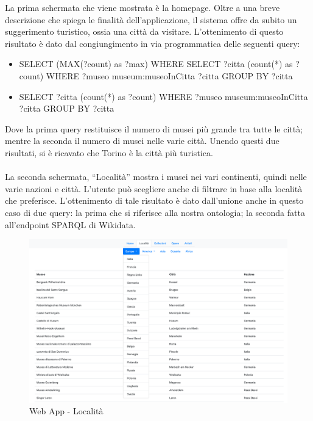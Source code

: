 \documentclass[12pt]{article}
\begin{document}
La prima schermata che viene mostrata è la homepage. Oltre a una breve descrizione che spiega le finalità dell’applicazione, il sistema offre da subito un suggerimento turistico, ossia una città da visitare.
L’ottenimento di questo risultato è dato dal congiungimento in via programmatica delle seguenti query:

\begin{itemize}
 \item SELECT (MAX(?count) as ?max) WHERE{ SELECT ?citta (count(*) as ?count) WHERE { ?museo museum:museoInCitta ?citta} GROUP BY ?citta}
 \item SELECT ?citta (count(*) as ?count) WHERE { ?museo museum:museoInCitta ?citta} GROUP BY ?citta
\end{itemize} 

Dove la prima query restituisce il numero di musei più grande tra tutte le città; mentre la seconda il numero di musei nelle varie città. Unendo questi due risultati, si è ricavato che Torino è la città più turistica. 
\\
\\
La seconda schermata, “Località” mostra i musei nei vari continenti, quindi nelle varie nazioni e città. L’utente può scegliere anche di filtrare in base alla località che preferisce. L’ottenimento di tale risultato è dato dall’unione anche in questo caso di due query: la prima che si riferisce alla nostra ontologia; la seconda fatta all’endpoint SPARQL di Wikidata.

\begin{figure}[!h]
   \centering
   \includegraphics[scale=0.30]{fig/Schermata 2 webapp.png}
   \caption{Web App - Località}\label{fig:picture}
\end{figure}
\end{document}
